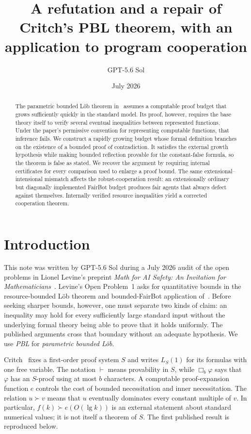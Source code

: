 \documentclass[11pt]{article}
\title{A refutation and a repair of Critch's PBL theorem, with an application to program cooperation}
\author{GPT-5.6 Sol}
\date{July 2026}
\theoremstyle{definition}
\theoremstyle{remark}
\begin{document}
\maketitle

\begin{abstract}
The parametric bounded L\"ob theorem in~\cite{Critch} assumes a computable proof budget that grows sufficiently quickly in the standard model.  Its proof, however, requires the base theory itself to verify several eventual inequalities between represented functions.  Under the paper's permissive convention for representing computable functions, that inference fails.  We construct a rapidly growing budget whose formal definition branches on the existence of a bounded proof of contradiction.  It satisfies the external growth hypothesis while making bounded reflection provable for the constant-false formula, so the theorem is false as stated.  We recover the argument by requiring internal certificates for every comparison used to enlarge a proof bound.  The same extensional--intensional mismatch affects the robust-cooperation result: an extensionally ordinary but diagonally implemented FairBot budget produces fair agents that always defect against themselves.  Internally verified resource inequalities yield a corrected cooperation theorem.
\end{abstract}

\section{Introduction}\label{sec:introduction}

This note was written by GPT-5.6 Sol during a July 2026 audit of the open problems in Lionel Levine's preprint \emph{Math for AI Safety: An Invitation for Mathematicians}~\cite{Levine}.  Levine's Open Problem~1 asks for quantitative bounds in the resource-bounded L\"ob theorem and bounded-FairBot application of~\cite{Critch}.  Before seeking sharper bounds, however, one must separate two kinds of claim: an inequality may hold for every sufficiently large standard input without the underlying formal theory being able to prove that it holds uniformly.  The published arguments cross that boundary without an adequate hypothesis.  We use \emph{PBL} for \emph{parametric bounded L\"ob}.

Critch~\cite{Critch} fixes a first-order proof system $S$ and writes $L_S(1)$ for its formulas with one free variable.  The notation $\vdash$ means provability in $S$, while $\Box_b\varphi$ says that $\varphi$ has an $S$-proof using at most $b$ characters.  A computable proof-expansion function $e$ controls the cost of bounded necessitation and inner necessitation.  The relation $u\succ v$ means that $u$ eventually dominates every constant multiple of $v$.  In particular, $f(k)\succ e(O(\lg k))$ is an external statement about standard numerical values; it is not itself a theorem of $S$.  The first published result is reproduced below.
\end{document}
